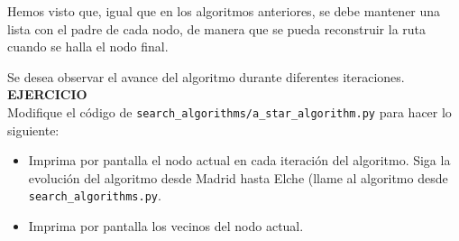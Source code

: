 \documentclass{article}
\begin{document}
 
Hemos visto que, igual que en los algoritmos anteriores, se debe mantener una lista con el padre de cada nodo, de manera que se pueda reconstruir la ruta cuando se halla el nodo final.
\begin{exercise}
    Se desea observar el avance del algoritmo durante diferentes iteraciones.\\
    \textbf{EJERCICIO}\\
    Modifique el código de \texttt{search\_algorithms/a\_star\_algorithm.py} para hacer lo siguiente:
    \begin{itemize}
        \item Imprima por pantalla el nodo actual en cada iteración del algoritmo. Siga la evolución del algoritmo desde Madrid hasta Elche (llame al algoritmo desde \texttt{search\_algorithms.py}.
        \item Imprima por pantalla los vecinos del nodo actual.
    \end{itemize}    
\end{exercise}

\end{document}
